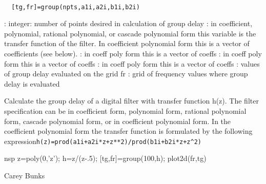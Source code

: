 
\begin{mandesc}
   \\ %
\end{mandesc}
\begin{calling_sequence}
\begin{verbatim}
  [tg,fr]=group(npts,a1i,a2i,b1i,b2i)  
\end{verbatim}
\end{calling_sequence}
\begin{parameters}
  \begin{varlist}
    : integer: number of points desired in calculation of group delay
    : in coefficient, polynomial, rational polynomial, or cascade polynomial form this variable is the transfer function of the filter. In coefficient polynomial form this is a vector of coefficients (see below).
    : in coeff poly form this is a vector of coeffs
    : in coeff poly form this is a vector of coeffs
    : in coeff poly form this is a vector of coeffs
    : values of group delay evaluated on the grid fr
    : grid of frequency values where group delay is evaluated
  \end{varlist}
\end{parameters}
\begin{mandescription}
  Calculate the group delay of a digital filter
  with transfer function h(z).
  The filter specification can be in coefficient form,
  polynomial form, rational polynomial form, cascade
  polynomial form, or in coefficient polynomial form.
  In the coefficient polynomial form the transfer function is
  formulated by the following expression\verb!h(z)=prod(a1i+a2i*z+z**2)/prod(b1i+b2i*z+z^2)!
\end{mandescription}
\begin{examples}
  \begin{mintednsp}{nsp}
    z=poly(0,'z');
    h=z/(z-.5);
    [tg,fr]=group(100,h);
    plot2d(fr,tg)
  \end{mintednsp}
\end{examples}
\begin{authors}
    Carey Bunks  
\end{authors}
